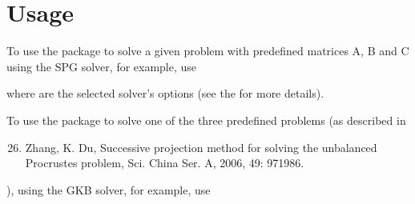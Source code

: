 \documentclass[a4paper,10pt,english]{sphinxmanual}
\begin{document}
\chapter{Usage}
\label{\detokenize{index:usage}}
To use the package to solve a given problem with predefined matrices A, B and C
using the SPG solver, for example, use

\begin{sphinxVerbatim}[commandchars=\\\{\}]
   
       
  
  
\end{sphinxVerbatim}

where  are the selected solver’s options (see the  for more details).

To use the package to solve one of the three predefined problems (as described in %
\begin{footnote}[4]\sphinxAtStartFootnote
\begin{enumerate}
\setcounter{enumi}{25}
\item {} 
Zhang, K. Du, Successive projection method for solving the unbalanced Procrustes problem, Sci. China Ser. A, 2006, 49: 971\textendash{}986.

\end{enumerate}
%
\end{footnote}), using the GKB solver, for example, use

\begin{sphinxVerbatim}[commandchars=\\\{\}]
   
       
  
  
\end{sphinxVerbatim}
\end{document}
